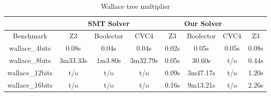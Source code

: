 \begin{table}[t]
\centering
\caption{Wallace tree multiplier}
\label{my-label}
\begin{tabular}{|c|c|c|c|c|c|c|c|}
\hline
                & \multicolumn{3}{c|}{SMT Solver} & \multicolumn{3}{c|}{Our Solver} &       \\ \hline
Benchmark       & Z3       & Boolector & CVC4     & Z3      & Boolector   & CVC4    & Z3    \\ \hline
wallace\_4bits  & 0.08s    & 0.04s     & 0.04s    & 0.02s   & 0.05s       & 0.05s   & 0.08s \\ \hline
wallace\_8bits  & 3m33.33s & 1m3.80s   & 3m32.79s & 0.05s   & 30.60s      & t/o     & 0.44s \\ \hline
wallace\_12bits & t/o      & t/o       & t/o      & 0.09s   & 3m47.17s    & t/o     & 1.20s \\ \hline
wallace\_16bits & t/o      & t/o       & t/o      & 0.16s   & 9m13.21s   & t/o     & 2.26s \\ \hline
\end{tabular}
\end{table}

